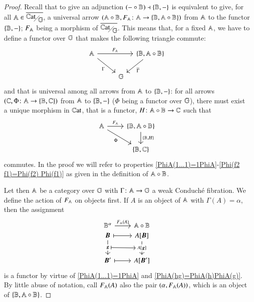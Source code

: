 \begin{proof}
    Recall that to give an adjunction $ (- \circ \mathbb B) \dashv \{ \mathbb B,-\}$ is equivalent to give, for all $\A \in \WCFover\gcf$, a universal arrow $(\mathbb A \circ \mathbb B, F_\mathbb A \colon \mathbb A \to \{ \mathbb B,\mathbb A \circ \mathbb B\})$ from $\mathbb A$ to the functor $\{ \mathbb B,-\}$; $F_\mathbb A$ being a morphism of $\WCFover\gcf$. This means that, for a fixed $\mathbb A$, we have to define a functor over $\mathbb G$ that makes the following triangle commute:
    \[
    \begin{tikzcd}[column sep={1.5cm,between origins}]
    \A \ar[rr,"F_\A"] \ar[dr,"\Gamma"'] & & \FC \B {\ring \A \B} \ar[dl,"\gf"] \\
    & \gcf
    \end{tikzcd}
    \]
    and that is universal among all arrows from $\mathbb A$ to $\{ \mathbb B,-\}$: for all arrows $(\mathbb C, \Phi \colon \mathbb A \to \{ \mathbb B,\mathbb C\})$ from $\mathbb A$ to $\{ \mathbb B,-\}$ ($\Phi$ being a functor over $\mathbb G$), there must exist a unique morphism in $\mathbb{C}\mathrm{at}$, that is a functor, $H \colon \mathbb A \circ \mathbb B \to \mathbb C$ such that
    \[
    \begin{tikzcd}
    \A \ar[r,"F_\A"] \ar[dr,"\Phi"'] & \FC \B {\ring \A \B} \ar[d,"{\FC \B H}"] \\
    & \FC \B \C 
    \end{tikzcd}
    \]
    commutes. In the proof we will refer to properties \ref{PhiA(1...1)=1PhiA}-\ref{Phi(f2 f1)=Phi(f2) Phi(f1)} as given in the definition of $\mathbb A \circ \mathbb B$.
    
    Let then $\mathbb A$ be a category over $\mathbb G$ with $\Gamma \colon \mathbb A \to \mathbb G$ a weak Conduché fibration. We define the action of $F_\mathbb A$ on objects first. If $A$ is an object of $\mathbb A$ with $\Gamma(A)=\alpha$, then the assignment
    \[
    \begin{tikzcd}[row sep=0em]
    \B^{\alpha} \ar[r,"F_\A(A)"] & \ring \A \B \\
    \bfB \ar[|->,r] \ar{d}[description,name=A]{\bfg} & A[\bfB] \ar{d}[description,name=B]{{A[\bfg]}}     \\[2em]
    \bfB' \ar[|->,r] & A[\bfB']
    \arrow[from=A,to=B,|->]
    \end{tikzcd}
    \] 
    is a functor by virtue of \ref{PhiA(1...1)=1PhiA} and \ref{PhiA(hg)=PhiA(h)PhiA(g)}. By little abuse of notation, call $F_\mathbb A(A)$ also the pair $(\alpha,F_\mathbb A(A))$, which is an object of $\{ \mathbb B,\mathbb A \circ \mathbb B\}$.
    

\end{proof}
